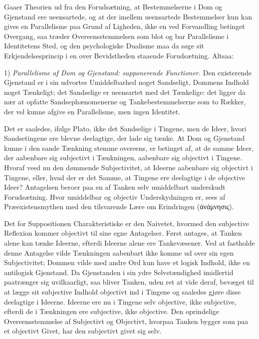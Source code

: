 \documentclass[12pt]{book}
\newcommand{\opage}[1]{\marginnote{\footnotesize\textit{[#1]}}}
\begin{document}
Gaaer Theorien ud fra den Forudsætning, at Bestemmelserne
i Dom og Gjenstand ere ueensartede, og at der
imellem ueensartede Bestemmelser kun kan gives en Parallelisme
paa Grund af Ligheden, ikke en ved Forvandling
betinget Overgang, saa træder Overeensstemmelsen som blot
og bar Parallelisme i Identitetens Sted, og den psychologiske
Dualisme maa da søge sit Erkjendelsesprincip i en over Bevidstheden
staaende Forudsætning. Altsaa:

1) \emph{Parallelisme af Dom og Gjenstand: supponerende
Functioner.} Den existerende Gjenstand er i sin
udvortes Umiddelbarhed noget Sandseligt, Dommens Indhold
noget Tænkeligt; det Sandselige er ueensartet med det Tænkelige:
det ligger da nær at opfatte Sandsephænomenerne og
Tankebestemmelserne som to Rækker, der vel kunne afgive en
Parallelisme, men ingen Identitet.

Det er saaledes, ifølge Plato, ikke det Sandselige i
Tingene, men de Ideer, hvori Sandsetingene ere blevne deelagtige,
der lade sig tænke. At Dom og Gjenstand kunne i
den sande Tænkning stemme overeens, er betinget af, at de
samme Ideer, der aabenbare sig subjectivt i Tænkningen,
aabenbare sig objectivt i Tingene. Hvoraf veed nu den dømmende
Subjectivitet, at Ideerne aabenbare sig objectivt i
Tingene, eller, hvad der er det Samme, at Tingene ere deelagtige
i de objective Ideer? Antagelsen beroer paa en af
Tanken selv umiddelbart underskudt Forudsætning. Hvor umiddelbar
og objectiv Underskydningen er, sees af Præexistensmythen
med den tilsvarende Lære om Erindringen (ἀνάμνησις).

Det for Suppositionen Charakteristiske er den Naivetet,
hvormed den subjective Reflexion kommer objectivt til sine
egne Antagelser. Først antages, at Tanken alene kan tænke
Ideerne, efterdi Ideerne alene ere Tankevæsener. Ved at fastholde
denne Antagelse vilde Tænkningen aabenbart ikke
\opage{104}komme ud over sin egen Subjectivitet; Dommen vilde med
andre Ord kun have et logisk Indhold, ikke en antilogisk Gjenstand.
Da Gjenstanden i sin ydre Selvstændighed imidlertid
paatrænger sig uvilkaarligt, saa bliver Tanken, uden ret at
vide deraf, bevæget til at lægge sit subjective Indhold objectivt
ind i Tingene og saaledes gjøre disse deelagtige i Ideerne.
Ideerne ere nu i Tingene selv objective, ikke subjective, efterdi
de i Tænkningen ere subjective, ikke objective. Den oprindelige
Overeensstemmelse af Subjectivt og Objectivt, hvorpaa
Tanken bygger som paa et objectivt Givet, har den subjectivt
givet sig selv.
\end{document}
